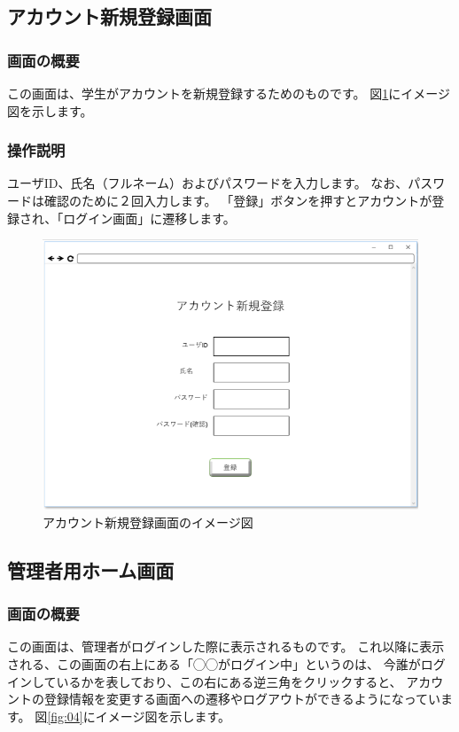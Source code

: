 \subsection{アカウント新規登録画面\label{creat_account}}
\subsubsection{画面の概要}
この画面は、学生がアカウントを新規登録するためのものです。
図\ref{fig:03}にイメージ図を示します。

\subsubsection{操作説明}
ユーザID、氏名（フルネーム）およびパスワードを入力します。
なお、パスワードは確認のために２回入力します。
「登録」ボタンを押すとアカウントが登録され、「ログイン画面」に遷移します。

\begin{figure}[htbp]
  \begin{center}
    \includegraphics[width=0.7\linewidth,clip]{./img/03.png}
    \caption{アカウント新規登録画面のイメージ図}\label{fig:03}
  \end{center}
\end{figure}

\newpage

\subsection{管理者用ホーム画面}
\subsubsection{画面の概要}
この画面は、管理者がログインした際に表示されるものです。
これ以降に表示される、この画面の右上にある「◯◯がログイン中」というのは、
今誰がログインしているかを表しており、この右にある逆三角をクリックすると、
アカウントの登録情報を変更する画面への遷移やログアウトができるようになっています。
図\ref{fig:04}にイメージ図を示します。

